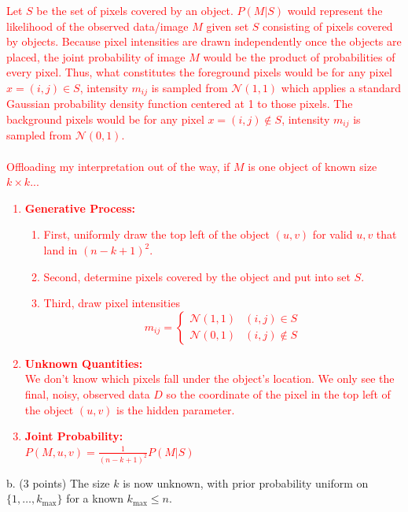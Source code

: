 \documentclass[11pt]{article}
\begin{document}
\textcolor{red}{
Let $S$ be the set of pixels covered by an object. $P(M|S)$ would represent the likelihood of the observed data/image $M$ given set $S$ consisting of pixels covered by objects. Because pixel intensities are drawn independently once the objects are placed, the joint probability of image $M$ would be the product of probabilities of every pixel. Thus, what constitutes the foreground pixels would be for any pixel $x=(i,j) \in S$, intensity $m_{ij}$ is sampled from $\mathcal N(1,1)$ which applies a standard Gaussian probability density function centered at 1 to those pixels. The background pixels would be for any pixel $x=(i,j) \notin S$, intensity $m_{ij}$ is sampled from $\mathcal N(0,1)$.\\
\\
Offloading my interpretation out of the way, if $M$ is one object of known size $k \times k$...
\begin{enumerate}
    \item \textbf{Generative Process:}\\
        \begin{enumerate}
            \item 
                First, uniformly draw the top left of the object $(u,v)$ for valid $u,v$ that land in $(n-k+1)^2$.
            \item 
                Second, determine pixels covered by the object and put into set $S$.
            \item 
                Third, draw pixel intensities
                \[
                m_{ij} = 
                \begin{cases} 
                      \mathcal N(1,1) & (i,j) \in S \\
                      \mathcal N(0,1) & (i,j) \notin S 
                \end{cases}
                \]
        \end{enumerate}
    \item \textbf{Unknown Quantities:}\\
        We don't know which pixels fall under the object's location. We only see the final, noisy, observed data $D$ so the coordinate of the pixel in the top left of the object $(u,v)$ is the hidden parameter.
    \item \textbf{Joint Probability:}\\
        $P(M, u, v) = \frac{1}{(n-k+1)^2} P(M|S)$
\end{enumerate}
}

b. (3 points) The size $k$ is now unknown, with prior probability uniform on $\{1,\ldots,k_{\max}\}$ for a known $k_{\max}\le n$.
\end{document}
